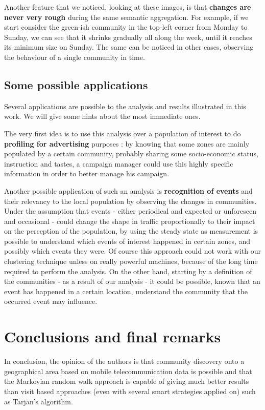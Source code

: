\documentclass[12pt,a4paper]{article}
\begin{document}
Another feature that we noticed, looking at these images, is that \textbf{changes are never very rough} during the same semantic aggregation.
For example, if we start consider the green-ish community in the top-left corner from Monday to Sunday, we can see that it shrinks gradually all along the week, until it reaches its minimum size on Sunday. The same can be noticed in other cases, observing the behaviour of a single community in time. 

\subsection{Some possible applications}

Several applications are possible to the analysis and results illustrated in this work.
We will give some hints about the most immediate ones.

The very first idea is to use this analysis over a population of interest to do \textbf{profiling for advertising} purposes : by knowing that some zones are mainly populated by a certain community, probably sharing some socio-economic status, instruction and tastes, a campaign manager could use this highly specific information in order to better manage his campaign.

Another possible application of such an analysis is \textbf{recognition of events} and their relevancy to the local population by observing the changes in communities. Under the assumption that events - either periodical and expected or unforeseen and occasional - could change the shape in traffic proportionally to their impact on the perception of the population, by using the steady state as measurement is possible to understand which events of interest happened in certain zones, and possibly which events they were.
Of course this approach could not work with our clustering technique unless on really powerful machines, because of the long time required to perform the analysis.
On the other hand, starting by a definition of the communities - as a result of our
analysis - it could be possible, known that an event has happened in a certain location,
understand the community that the occurred event may influence.
\newpage

\section{Conclusions and final remarks}

In conclusion, the opinion of the authors is that community discovery
onto a geographical area based on mobile telecommunication data
is possible and that the Markovian random walk approach is capable of giving much better
results than visit based approaches (even with several smart strategies applied on) such as Tarjan's algorithm. 
\end{document}
